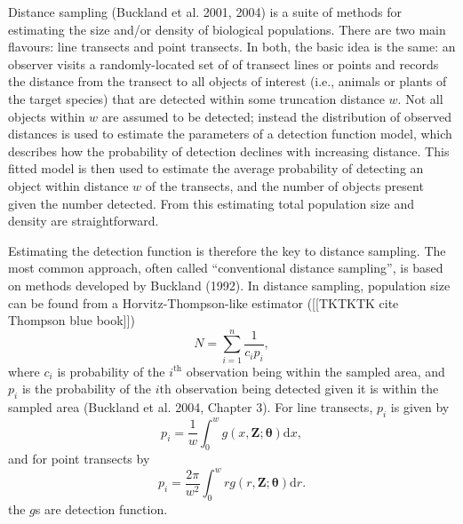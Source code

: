 \documentclass[useAMS,referee, usegraphicx]{biom}
\begin{document}
Distance sampling (Buckland et al. 2001, 2004) is a suite of methods for estimating the size and/or density of biological populations.  There are two main flavours: line transects and point transects.  In both, the basic idea is the same: an observer visits a randomly-located set of of transect lines or points and records the distance from the transect to all objects of interest (i.e., animals or plants of the target species) that are detected within some truncation distance $w$.  Not all objects within $w$ are assumed to be detected; instead the distribution of observed distances is used to estimate the parameters of a detection function model, which describes how the probability of detection declines with increasing distance.  This fitted model is then used to estimate the average probability of detecting an object within distance $w$ of the transects, and the number of objects present given the number detected. From this estimating total population size and density are straightforward.

Estimating the detection function is therefore the key to distance sampling.  The most common approach, often called ``conventional distance sampling'', is based on methods developed by Buckland (1992). In distance sampling, population size can be found from a Horvitz-Thompson-like estimator ([[TKTKTK cite Thompson blue book]])
\begin{equation}
N = \sum_{i=1}^n \frac{1}{c_i p_i},
\label{HT}
\end{equation}
where $c_i$ is probability of the $i^\text{th}$ observation being within the sampled area, and $p_i$ is the probability of the $i\text{th}$ observation being detected given it is within the sampled area (Buckland et al. 2004, Chapter 3).  For line transects, $p_i$ is given by
\begin{equation*}
p_i = \frac{1}{w} \int_0^w  g(x,\mathbf{Z}; \bm{\theta}) \text{d}x,
\end{equation*}
and for point transects by
\begin{equation*}
p_i = \frac{2\pi}{w^2} \int_0^w  r g(r,\mathbf{Z}; \bm{\theta}) \text{d}r.
\end{equation*}
the $g$s are detection function.
\end{document}
